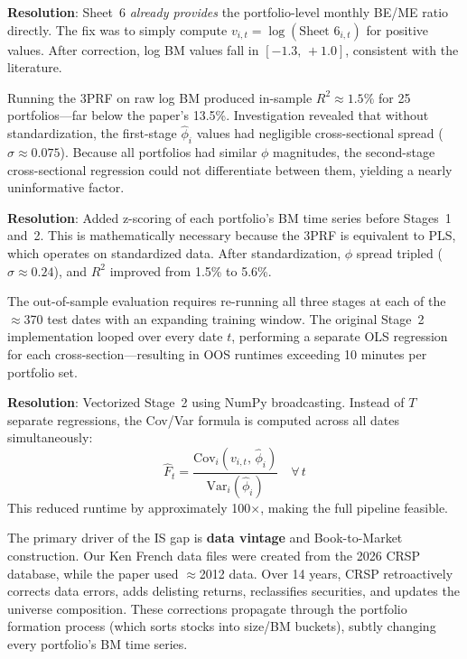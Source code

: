 \documentclass[10pt,letterpaper]{handout}
\begin{document}
\smallskip
\textbf{Resolution}: Sheet~6 \textit{already provides} the portfolio-level monthly BE/ME ratio directly. The fix was to simply compute $v_{i,t} = \log(\text{Sheet~6}_{i,t})$ for positive values. After correction, log BM values fall in $[-1.3,\, +1.0]$, consistent with the literature.

\divider


Running the 3PRF on raw log BM produced in-sample $R^2 \approx 1.5\%$ for 25 portfolios---far below the paper's 13.5\%. Investigation revealed that without standardization, the first-stage $\hat{\phi}_i$ values had negligible cross-sectional spread ($\sigma \approx 0.075$). Because all portfolios had similar $\phi$ magnitudes, the second-stage cross-sectional regression could not differentiate between them, yielding a nearly uninformative factor.

\smallskip
\textbf{Resolution}: Added z-scoring of each portfolio's BM time series before Stages~1 and~2. This is mathematically necessary because the 3PRF is equivalent to PLS, which operates on standardized data. After standardization, $\phi$ spread tripled ($\sigma \approx 0.24$), and $R^2$ improved from 1.5\% to 5.6\%.

\divider


The out-of-sample evaluation requires re-running all three stages at each of the $\approx$370 test dates with an expanding training window. The original Stage~2 implementation looped over every date $t$, performing a separate OLS regression for each cross-section---resulting in OOS runtimes exceeding 10 minutes per portfolio set.

\smallskip
\textbf{Resolution}: Vectorized Stage~2 using NumPy broadcasting. Instead of $T$ separate regressions, the Cov/Var formula is computed across all dates simultaneously:
\[
  \hat{F}_t = \frac{\text{Cov}_i(v_{i,t},\, \hat{\phi}_i)}{\text{Var}_i(\hat{\phi}_i)} \quad \forall\, t
\]
This reduced runtime by approximately 100$\times$, making the full pipeline feasible.

\divider



The primary driver of the IS gap is \textbf{data vintage} and Book-to-Market construction. Our Ken French data files were created from the 2026 CRSP database, while the paper used $\approx$2012 data. Over 14 years, CRSP retroactively corrects data errors, adds delisting returns, reclassifies securities, and updates the universe composition. These corrections propagate through the portfolio formation process (which sorts stocks into size/BM buckets), subtly changing every portfolio's BM time series.
\end{document}

